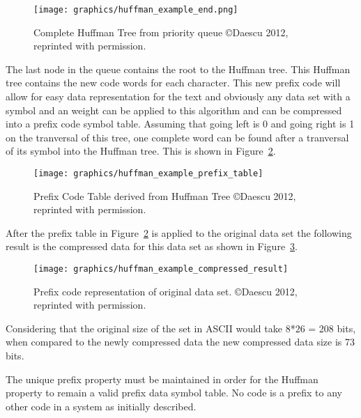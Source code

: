 \documentclass[letterpaper, 12pt]{article}
\begin{document}
\begin{figure}
  \centering
  \texttt{[image: graphics/huffman\_example\_end.png]}
  \caption{Complete Huffman Tree from priority queue  \copyright Daescu 2012, reprinted with permission.\cite{huffman}}
  \label{fig:huffman_full_tree}
\end{figure}

The last node in the queue contains the root to the Huffman tree. This Huffman tree
contains the new code words for each character. This new prefix code will allow for easy
data representation for the text and obviously any data set with a symbol and an weight can
be applied to this algorithm and can be compressed into a prefix code symbol table.
Assuming that going left is 0 and going right is 1 on the tranversal of this tree, one complete
word can be found after a tranversal of its symbol into the Huffman tree. This is shown in
Figure~\ref{fig:huffman_prefix_table}.
\par\vspace{\baselineskip}

\begin{figure}
  \centering
  \texttt{[image: graphics/huffman\_example\_prefix\_table]}
  \caption{Prefix Code Table derived from Huffman Tree  \copyright Daescu 2012, reprinted with permission.\cite{huffman}}
  \label{fig:huffman_prefix_table}
\end{figure}

\par\vspace{\baselineskip}
After the prefix table in Figure~\ref{fig:huffman_prefix_table} is applied to the original data set the following result is the compressed
data for this data set as shown in Figure~\ref{fig:huffman_compressed}.
\par\vspace{\baselineskip}
\begin{figure}
  \centering
  \texttt{[image: graphics/huffman\_example\_compressed\_result]}
  \caption{Prefix code representation of original data set.  \copyright Daescu 2012, reprinted with permission.\cite{huffman}}
  \label{fig:huffman_compressed}
\end{figure}

Considering that the original size of the set in ASCII would take 8*26 = 208 bits, when compared to
the newly compressed data the new compressed data size is 73 bits.
\par\vspace{\baselineskip}
The unique prefix property must be maintained in order for the Huffman property to remain a valid prefix
data symbol table. No code is a prefix to any other code in a system as initially described.
\par\vspace{\baselineskip}
\end{document}
